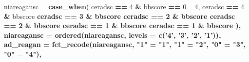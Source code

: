 \documentclass[]{book}
\newenvironment{Shaded}{\begin{snugshade}}{\end{snugshade}}
\newcommand{\DataTypeTok}[1]{\textcolor[rgb]{0.13,0.29,0.53}{#1}}
\newcommand{\DecValTok}[1]{\textcolor[rgb]{0.00,0.00,0.81}{#1}}
\newcommand{\KeywordTok}[1]{\textcolor[rgb]{0.13,0.29,0.53}{\textbf{#1}}}
\newcommand{\NormalTok}[1]{#1}
\newcommand{\OperatorTok}[1]{\textcolor[rgb]{0.81,0.36,0.00}{\textbf{#1}}}
\newcommand{\StringTok}[1]{\textcolor[rgb]{0.31,0.60,0.02}{#1}}
\begin{document}
\begin{Shaded}
\begin{Highlighting}[]
{{{{{{{{{{{{        \DataTypeTok{niareagansc =} \KeywordTok{case_when}\NormalTok{(}
\NormalTok{          ceradsc }\OperatorTok{==}\StringTok{ }\DecValTok{4} \OperatorTok{&}\StringTok{ }\NormalTok{bbscore }\OperatorTok{==}\StringTok{ }\DecValTok{0} \OperatorTok{~}\StringTok{ }\DecValTok{4}\NormalTok{, }
\NormalTok{          ceradsc }\OperatorTok{==}\StringTok{ }\DecValTok{4} \OperatorTok{&}\StringTok{ }\NormalTok{bbscore }\OperatorTok{%in%}\StringTok{ }\KeywordTok{c}\NormalTok{(}\DecValTok{1}\OperatorTok{:}\DecValTok{6}\NormalTok{) }\OperatorTok{~}\StringTok{ }\DecValTok{3}\NormalTok{, }
\NormalTok{          ceradsc }\OperatorTok{==}\StringTok{ }\DecValTok{3} \OperatorTok{&}\StringTok{ }\NormalTok{bbscore }\OperatorTok{%in%}\StringTok{ }\KeywordTok{c}\NormalTok{(}\DecValTok{0}\OperatorTok{:}\DecValTok{6}\NormalTok{) }\OperatorTok{~}\StringTok{ }\DecValTok{3}\NormalTok{, }
\NormalTok{          ceradsc }\OperatorTok{==}\StringTok{ }\DecValTok{2} \OperatorTok{&}\StringTok{ }\NormalTok{bbscore }\OperatorTok{%in%}\StringTok{ }\KeywordTok{c}\NormalTok{(}\DecValTok{0}\OperatorTok{:}\DecValTok{2}\NormalTok{) }\OperatorTok{~}\StringTok{ }\DecValTok{3}\NormalTok{,}
\NormalTok{          ceradsc }\OperatorTok{==}\StringTok{ }\DecValTok{2} \OperatorTok{&}\StringTok{ }\NormalTok{bbscore }\OperatorTok{%in%}\StringTok{ }\KeywordTok{c}\NormalTok{(}\DecValTok{3}\OperatorTok{:}\DecValTok{6}\NormalTok{) }\OperatorTok{~}\StringTok{ }\DecValTok{2}\NormalTok{,}
\NormalTok{          ceradsc }\OperatorTok{==}\StringTok{ }\DecValTok{1} \OperatorTok{&}\StringTok{ }\NormalTok{bbscore }\OperatorTok{%in%}\StringTok{ }\KeywordTok{c}\NormalTok{(}\DecValTok{0}\OperatorTok{:}\DecValTok{4}\NormalTok{) }\OperatorTok{~}\StringTok{ }\DecValTok{2}\NormalTok{,}
\NormalTok{          ceradsc }\OperatorTok{==}\StringTok{ }\DecValTok{1} \OperatorTok{&}\StringTok{ }\NormalTok{bbscore }\OperatorTok{%in%}\StringTok{ }\KeywordTok{c}\NormalTok{(}\DecValTok{5}\OperatorTok{:}\DecValTok{6}\NormalTok{) }\OperatorTok{~}\StringTok{ }\DecValTok{1}\NormalTok{,}
\NormalTok{        ), }
        \DataTypeTok{niareagansc =} \KeywordTok{ordered}\NormalTok{(niareagansc, }\DataTypeTok{levels =} \KeywordTok{c}\NormalTok{(}\StringTok{'4'}\NormalTok{, }\StringTok{'3'}\NormalTok{, }\StringTok{'2'}\NormalTok{, }\StringTok{'1'}\NormalTok{)),}
        \DataTypeTok{ad_reagan =} \KeywordTok{fct_recode}\NormalTok{(niareagansc, }\StringTok{"1"}\NormalTok{ =}\StringTok{ "1"}\NormalTok{, }\StringTok{"1"}\NormalTok{ =}\StringTok{ "2"}\NormalTok{, }\StringTok{"0"}\NormalTok{ =}\StringTok{ "3"}\NormalTok{, }\StringTok{"0"}\NormalTok{ =}\StringTok{ "4"}\NormalTok{),}
}}}}}}}}}}}}}}}}}}
\end{Highlighting}
\end{Shaded}
\end{document}
